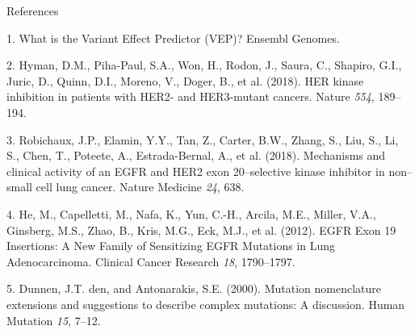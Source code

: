 \documentclass[
  ignorenonframetext,
]{beamer}
\begin{document}
\begin{frame}[allowframebreaks]{References}
\protect\hypertarget{references}{}

\hypertarget{refs}{}
\leavevmode\hypertarget{ref-__what_}{}%
1. What is the Variant Effect Predictor (VEP)? \textbar{} Ensembl
Genomes.

\leavevmode\hypertarget{ref-hyman_2018_her_nature}{}%
2. Hyman, D.M., Piha-Paul, S.A., Won, H., Rodon, J., Saura, C., Shapiro,
G.I., Juric, D., Quinn, D.I., Moreno, V., Doger, B., et al. (2018). HER
kinase inhibition in patients with HER2- and HER3-mutant cancers. Nature
\emph{554}, 189--194.

\leavevmode\hypertarget{ref-robichaux_2018_mechanisms_natmed}{}%
3. Robichaux, J.P., Elamin, Y.Y., Tan, Z., Carter, B.W., Zhang, S., Liu,
S., Li, S., Chen, T., Poteete, A., Estrada-Bernal, A., et al. (2018).
Mechanisms and clinical activity of an EGFR and HER2 exon 20--selective
kinase inhibitor in non--small cell lung cancer. Nature Medicine
\emph{24}, 638.

\leavevmode\hypertarget{ref-he_2012_egfr_clinicalcancerresearch}{}%
4. He, M., Capelletti, M., Nafa, K., Yun, C.-H., Arcila, M.E., Miller,
V.A., Ginsberg, M.S., Zhao, B., Kris, M.G., Eck, M.J., et al. (2012).
EGFR Exon 19 Insertions: A New Family of Sensitizing EGFR Mutations in
Lung Adenocarcinoma. Clinical Cancer Research \emph{18}, 1790--1797.

\leavevmode\hypertarget{ref-dunnen_2000_mutation_hummutat}{}%
5. Dunnen, J.T. den, and Antonarakis, S.E. (2000). Mutation nomenclature
extensions and suggestions to describe complex mutations: A discussion.
Human Mutation \emph{15}, 7--12.

\end{frame}
\end{document}
